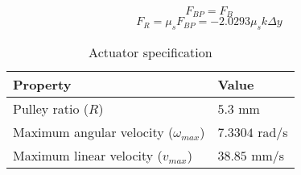 \begin{equation}
    \label{eq:force-fbp}
    F_{BP}=F_B
\end{equation}
\begin{equation}
    \label{eq:force-fr}
    F_{R}=\mu_{s}F_{BP}=-2.0293\mu_{s}k\Delta y
\end{equation}

\begin{table}[H]
    \centering
    \caption{Actuator specification}
    \label{tab:actuator-specs}
    \begin{tabular}{ll}
    \toprule
    Property & Value \\
    \midrule
    Pulley ratio ($R$) & $5.3$ mm \\
    Maximum angular velocity ($\omega_{max}$) & $7.3304$ rad/s \\
    Maximum linear velocity ($v_{max}$) & $38.85$ mm/s \\
    \bottomrule
    \end{tabular}
\end{table}